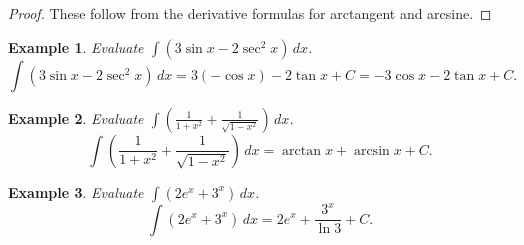 \documentclass[11pt,a4paper]{article}
\newtheorem{example}{Example}
\begin{document}
\begin{proof}
These follow from the derivative formulas for arctangent and arcsine.
\end{proof}
\begin{example}
Evaluate $\displaystyle \int (3\sin x - 2\sec^2 x) \, dx$.
\[
\int (3\sin x - 2\sec^2 x) \, dx = 3(-\cos x) - 2\tan x + C = -3\cos x - 2\tan x + C.
\]
\end{example}
\begin{example}
Evaluate $\displaystyle \int \left( \frac{1}{1+x^2} + \frac{1}{\sqrt{1-x^2}} \right) \, dx$.
\[
\int \left( \frac{1}{1+x^2} + \frac{1}{\sqrt{1-x^2}} \right) \, dx = \arctan x + \arcsin x + C.
\]
\end{example}
\begin{example}
Evaluate $\displaystyle \int (2e^x + 3^x) \, dx$.
\[
\int (2e^x + 3^x) \, dx = 2e^x + \frac{3^x}{\ln 3} + C.
\]
\end{example}
\end{document}
